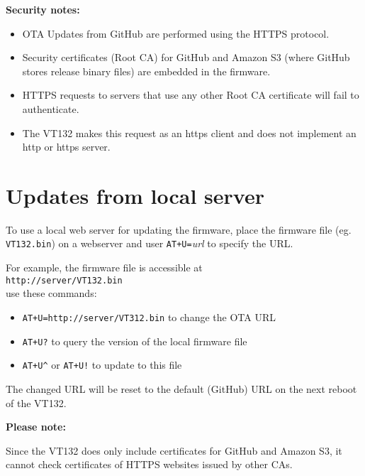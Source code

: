 \textbf{Security notes:}

\begin{itemize}[leftmargin=1em,noitemsep]
 \item OTA Updates from GitHub are performed using the HTTPS protocol.
 \item Security certificates (Root CA) for GitHub and Amazon S3 (where GitHub stores release binary files) are embedded in the firmware.
 \item HTTPS requests to servers that use any other Root CA certificate will fail to authenticate.
 \item The VT132 makes this request as an https client and does not implement an http or https server.
\end{itemize}

\section{Updates from local server}

To use a local web server for updating the firmware, place the firmware file (eg. \texttt{VT132.bin}) on a webserver and
user \texttt{AT+U=}\textit{url} to specify the URL.

For example, the firmware file is accessible at\\
\texttt{http://server/VT132.bin}\\
use these commands:

\begin{itemize}[leftmargin=1em,noitemsep]
 \item \texttt{AT+U=http://server/VT312.bin} to change the OTA URL
 \item \texttt{AT+U?} to query the version of the local firmware file
 \item \texttt{AT+U\textasciicircum} or \texttt{AT+U!} to update to this file
\end{itemize}

The changed URL will be reset to the default (GitHub) URL on the next reboot of the VT132.

\textbf{Please note:}

Since the VT132 does only include certificates for GitHub and Amazon S3, it cannot check certificates of HTTPS websites issued by other CAs.
